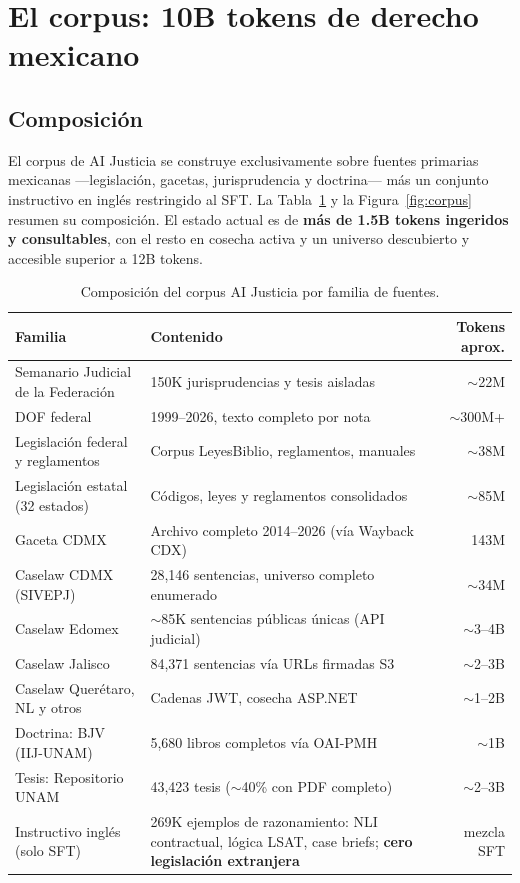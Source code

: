 \section{El corpus: 10B tokens de derecho mexicano}\label{sec:corpus}

\subsection{Composición}

El corpus de AI Justicia se construye exclusivamente sobre fuentes primarias mexicanas ---legislación, gacetas, jurisprudencia y doctrina--- más un conjunto instructivo en inglés restringido al SFT. La Tabla~\ref{tab:corpus} y la Figura~\ref{fig:corpus} resumen su composición. El estado actual es de \textbf{más de 1.5B tokens ingeridos y consultables}, con el resto en cosecha activa y un universo descubierto y accesible superior a 12B tokens.

\begin{table}[H]
\centering\small
\caption{Composición del corpus AI Justicia por familia de fuentes.}
\label{tab:corpus}
\begin{tabular}{@{}p{4.6cm}p{6.4cm}r@{}}
\toprule
\textbf{Familia} & \textbf{Contenido} & \textbf{Tokens aprox.} \\
\midrule
Semanario Judicial de la Federación\cite{sjf} & 150K jurisprudencias y tesis aisladas & $\sim$22M \\
DOF federal\cite{sidof} & 1999--2026, texto completo por nota & $\sim$300M+ \\
Legislación federal y reglamentos & Corpus LeyesBiblio, reglamentos, manuales & $\sim$38M \\
Legislación estatal (32 estados) & Códigos, leyes y reglamentos consolidados & $\sim$85M \\
Gaceta CDMX & Archivo completo 2014--2026 (vía Wayback CDX) & 143M \\
Caselaw CDMX (SIVEPJ) & 28,146 sentencias, universo completo enumerado & $\sim$34M \\
Caselaw Edomex & $\sim$85K sentencias públicas únicas (API judicial) & $\sim$3--4B \\
Caselaw Jalisco & 84,371 sentencias vía URLs firmadas S3 & $\sim$2--3B \\
Caselaw Querétaro, NL y otros & Cadenas JWT, cosecha ASP.NET & $\sim$1--2B \\
Doctrina: BJV (IIJ-UNAM) & 5,680 libros completos vía OAI-PMH & $\sim$1B \\
Tesis: Repositorio UNAM & 43,423 tesis ($\sim$40\% con PDF completo) & $\sim$2--3B \\
Instructivo inglés (solo SFT) & 269K ejemplos de razonamiento: NLI contractual, lógica LSAT, case briefs; \textbf{cero legislación extranjera} & mezcla SFT \\
\bottomrule
\end{tabular}
\end{table}

